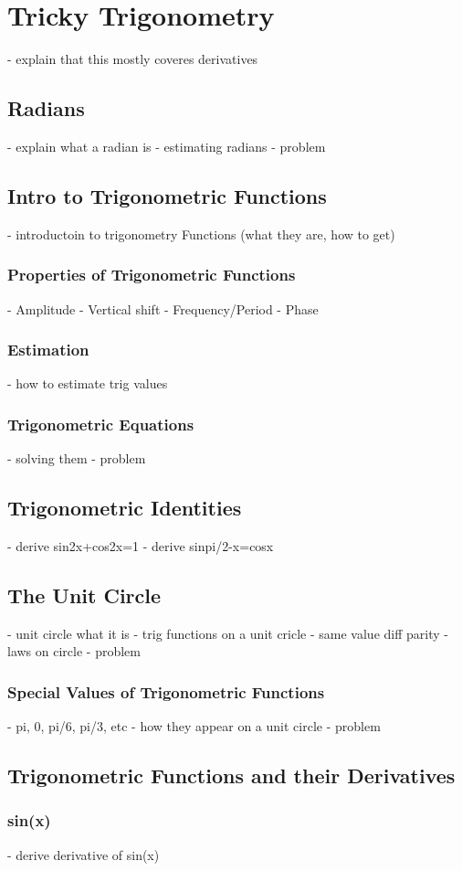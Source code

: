 \chapter{Tricky Trigonometry}
- explain that this mostly coveres derivatives
\section{Radians}
- explain what a radian is
- estimating radians
- problem
\section{Intro to Trigonometric Functions}
- introductoin to trigonometry Functions (what they are, how to get)
\subsection{Properties of Trigonometric Functions}
- Amplitude
- Vertical shift
- Frequency/Period
- Phase 
\subsection{Estimation}
- how to estimate trig values

\subsection{Trigonometric Equations}
- solving them
- problem
\section{Trigonometric Identities}
- derive sin2x+cos2x=1
- derive sinpi/2-x=cosx
\section{The Unit Circle}
- unit circle what it is
- trig functions on a unit cricle
- same value diff parity
- laws on circle
- problem
\subsection{Special Values of Trigonometric Functions}
- pi, 0, pi/6, pi/3, etc
- how they appear on a unit circle
- problem
\section{Trigonometric Functions and their Derivatives}
\subsection{sin(x)}
- derive derivative of sin(x)
